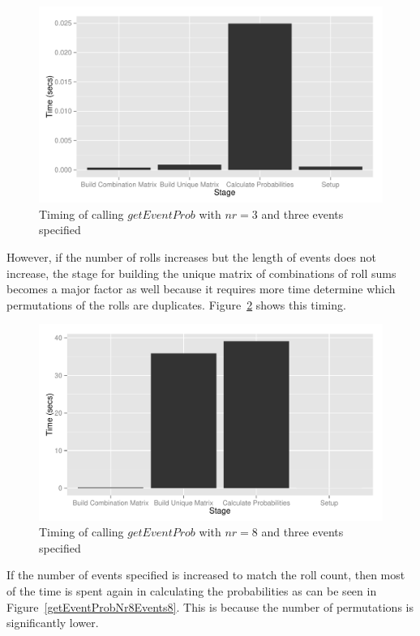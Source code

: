 \documentclass[12pt]{article}
\begin{document}
\begin{figure}[h!]
	\centering
	\includegraphics[width=6in]{getEventProbNr3.pdf}
	\caption{Timing of calling $getEventProb$ with $nr=3$ and three events specified}
	\label{getEventProbNr3}
\end{figure}

However, if the number of rolls increases but the length of events does not increase, the stage for building the unique matrix of combinations of roll sums becomes a major factor as well because it requires more time determine which permutations of the rolls are duplicates. Figure~\ref{getEventProbNr8} shows this timing.

\begin{figure}[h!]
	\centering
	\includegraphics[width=6in]{getEventProbNr8.pdf}
	\caption{Timing of calling $getEventProb$ with $nr=8$ and three events specified}
	\label{getEventProbNr8}
\end{figure}

If the number of events specified is increased to match the roll count, then most of the time is spent again in calculating the probabilities as can be seen in Figure~\ref{getEventProbNr8Events8}. This is because the number of permutations is significantly lower.
\end{document}
